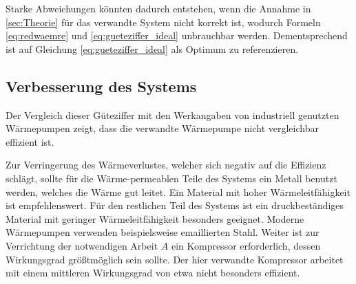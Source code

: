 Starke Abweichungen könnten dadurch entstehen, wenn die Annahme in \ref{sec:Theorie} für das verwandte System nicht korrekt ist, wodurch Formeln \eqref{eq:redwaemre} und \eqref{eq:gueteziffer_ideal} unbrauchbar werden. 
Dementsprechend ist auf Gleichung \eqref{eq:gueteziffer_ideal} als Optimum zu referenzieren.

\subsection{Verbesserung des Systems}
Der Vergleich dieser Güteziffer mit den Werkangaben von industriell genutzten Wärmepumpen zeigt, dass die verwandte Wärmepumpe nicht vergleichbar effizient ist.

Zur Verringerung des Wärmeverlustes, welcher sich negativ auf die Effizienz schlägt, sollte für die Wärme-permeablen Teile des Systems ein Metall benutzt werden, welches die Wärme gut leitet.
Ein Material mit hoher Wärmeleitfähigkeit ist empfehlenswert.
Für den restlichen Teil des Systems ist ein druckbeständiges Material mit geringer Wärmeleitfähigkeit besonders geeignet.
Moderne Wärmepumpen verwenden beispielsweise emaillierten Stahl\cite{viessmann_VITOCAL161A}.
Weiter ist zur Verrichtung der notwendigen Arbeit $A$ ein Kompressor erforderlich, dessen Wirkungsgrad größtmöglich sein sollte.
Der hier verwandte Kompressor arbeitet mit einem mittleren Wirkungsgrad von etwa %
nicht besonders effizient.